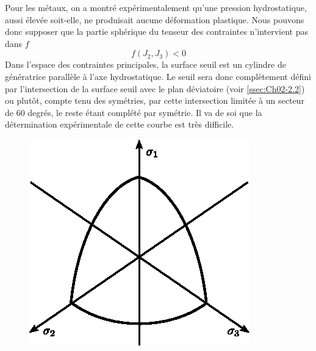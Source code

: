 Pour les métaux, on a montré expérimentalement qu'une pression hydrostatique, aussi élevée soit-elle, ne produisait aucune déformation plastique.
Nous pouvons donc supposer que la partie sphérique du tenseur des contraintes n'intervient pas dans $f$
\begin{equation}
    f \left( J_2, J_3 \right) < 0
    \label{eq:Ch05-061}
\end{equation}
Dans l'espace des contraintes principales, la surface seuil est un cylindre de génératrice parallèle à l'axe hydrostatique.
Le seuil sera donc complètement défini par l'intersection de la surface seuil avec le plan déviatoire (voir \ref{ssec:Ch02-2.2}) ou plutôt, compte tenu des symétries, par cette intersection limitée à un secteur de 60 degrés, le reste étant complété par symétrie.
Il va de soi que la détermination expérimentale de cette courbe est très difficile.
\begin{figure}
    \begin{center}
        \includegraphics{../images/T1_Ch05-02}
    \end{center}
\end{figure}


